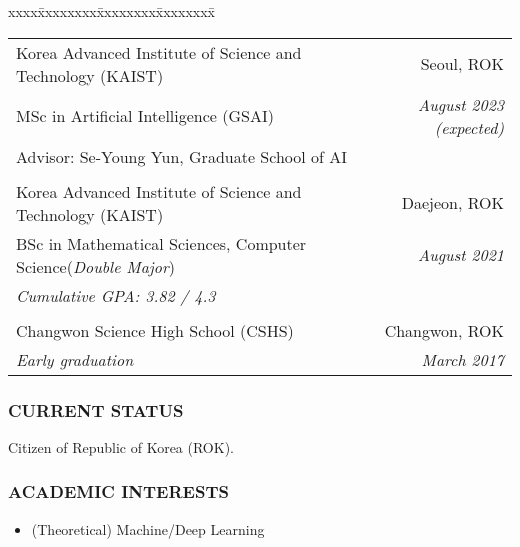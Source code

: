 \documentclass[10pt,a4]{article}
\begin{document}
\begin{small}

\begin{tabbing}
xxxx\=xxxxxxxx\=xxxxxxxx\=xxxxxxxx\=\kill

\>\begin{tabular*}{0.9\linewidth}{l@{\extracolsep{\fill}}r}
Korea Advanced Institute of Science and Technology (KAIST) & Seoul, ROK \\
MSc in Artificial Intelligence (GSAI) & {\it August 2023 (expected)}\\
Advisor: Se-Young Yun, Graduate School of AI \\
& \\
	
Korea Advanced Institute of Science and Technology (KAIST) & Daejeon, ROK \\
BSc in Mathematical Sciences, Computer Science({\it Double Major}) & {\it August 2021}\\
{\it Cumulative GPA: 3.82 / 4.3} \\
 & \\
 
Changwon Science High School (CSHS) & Changwon, ROK \\
{\it Early graduation} & {\it March 2017}
\end{tabular*}
\end{tabbing}

\subsubsection*{CURRENT STATUS}
\begin{list}{}{}
\item Citizen of Republic of Korea (ROK).
\end{list}

\subsubsection*{ACADEMIC INTERESTS}

\begin{itemize}{}{}
\item (Theoretical) Machine/Deep Learning


\end{itemize}
\end{small}
\end{document}
